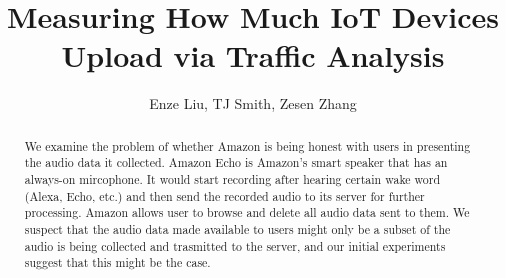 \documentclass[sigconf,anonymous=false]{acmart}
\begin{document}
\title{Measuring How Much IoT Devices Upload via Traffic Analysis} %
\author{Enze Liu, TJ Smith, Zesen Zhang}


\begin{abstract}
We examine the problem of whether Amazon is being honest with users in presenting the audio data it collected. Amazon Echo is Amazon's smart speaker that has an always-on mircophone. It would start recording after hearing certain wake word (Alexa, Echo, etc.) and then send the recorded audio to its server for further processing. Amazon allows user to browse and delete all audio data sent to them. We suspect that the audio data made available to users might only be a subset of the audio is being collected and trasmitted to the server, and our initial experiments suggest that this might be the case.
\end{abstract}




\maketitle




\end{document}
